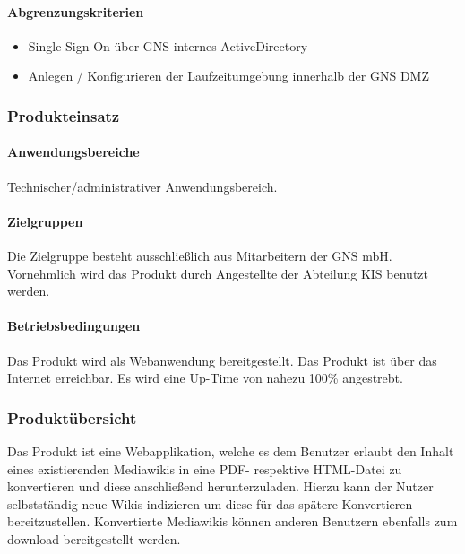 	\paragraph*{Abgrenzungskriterien}
		\begin{itemize}
			\item Single-Sign-On über GNS internes ActiveDirectory
			\item Anlegen / Konfigurieren der Laufzeitumgebung innerhalb der GNS DMZ
		\end{itemize}

\subsubsection*{Produkteinsatz}

	\paragraph*{Anwendungsbereiche}
		Technischer/administrativer Anwendungsbereich.

	\paragraph*{Zielgruppen}
		Die Zielgruppe besteht ausschließlich aus Mitarbeitern der GNS mbH.
		Vornehmlich wird das Produkt durch Angestellte der Abteilung KIS benutzt werden.

	\paragraph*{Betriebsbedingungen}
		Das Produkt wird als Webanwendung bereitgestellt. Das Produkt ist über das Internet erreichbar.
		Es wird eine Up-Time von nahezu 100\% angestrebt.


\subsubsection*{Produktübersicht}
	Das Produkt ist eine Webapplikation, welche es dem Benutzer erlaubt den Inhalt eines existierenden
	Mediawikis in eine PDF- respektive HTML-Datei zu konvertieren und diese anschließend herunterzuladen.
	Hierzu kann der Nutzer selbstständig neue Wikis indizieren um diese für das spätere Konvertieren
	bereitzustellen. Konvertierte Mediawikis können anderen Benutzern ebenfalls zum download bereitgestellt
	werden.